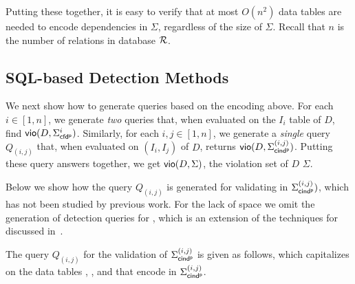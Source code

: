 Putting these together, it is easy to verify that at most $O(n^2)$
data tables are needed to encode dependencies in $\Sigma$,
regardless of the size of $\Sigma$. Recall that $n$ is the number of
relations in database $\R$.


\vspace{-1ex}
\subsection{SQL-based Detection Methods}

We next show how to generate \SQL queries based on the encoding
above. For each $i\in [1, n]$, we generate {\em two} \SQL queries
that, when evaluated on the $I_i$ table of $D$, find ${\mathsf{vio}}(D,
\Sigma_{{\mathsf{cfd^p}}}^i)$. Similarly, for each $i,j \in [1, n]$, we generate a {\em
single} \SQL query $Q_{(i,j)}$ that, when evaluated on $(I_i, I_j)$
of $D$, returns ${\mathsf{vio}}(D, \Sigma_{{\mathsf{cind^p}}}^{(i,j)})$. Putting these query
answers together, we get ${\mathsf{vio}}(D, \Sigma)$, the violation set of
$D$ \wrt $\Sigma$.


Below we show how the \SQL query $Q_{(i,j)}$ is generated for
validating \pCINDs in $\Sigma_{{\mathsf{cind^p}}}^{(i,j)})$, which has not been studied
by previous work. For the lack of space we omit the generation of
detection queries for \pCFDs, which is an extension of the
\SQL techniques for \CFDs discussed in~\cite{CFDs,icde08}.

The query $Q_{(i,j)}$ for the validation of $\Sigma_{{\mathsf{cind^p}}}^{(i,j)}$
is given as follows, which capitalizes on the data tables
\Enc{}, ,  and \Enc{\ne} that encode \pCINDs in
$\Sigma_{{\mathsf{cind^p}}}^{(i,j)}$.



\vspace{-1ex} \begin{footnotesize}\vspace{-1ex}
\end{footnotesize}

